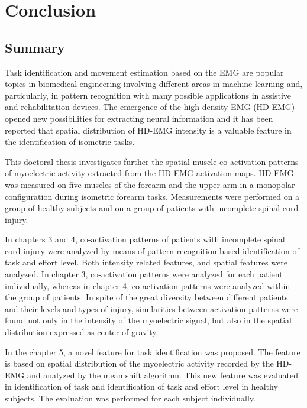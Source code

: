 \chapter{Conclusion}
\label{ch:conclusions}

\section{Summary}

Task identification and movement estimation based on the EMG are popular topics in biomedical engineering involving different areas in machine learning and, particularly, in pattern recognition with many possible applications in assistive and rehabilitation devices. The emergence of the high-density EMG (HD-EMG) opened new possibilities for extracting neural information and it has been reported that spatial distribution of HD-EMG intensity is a valuable feature in the identification of isometric tasks.

This doctoral thesis investigates further the spatial muscle co-activation patterns of myoelectric activity extracted from the HD-EMG activation maps. HD-EMG was measured on five muscles of the forearm and the upper-arm in a monopolar configuration during isometric forearm tasks. Measurements were performed on a group of healthy subjects and on a group of patients with incomplete spinal cord injury.

In chapters 3 and 4, co-activation patterns of patients with incomplete spinal cord injury were analyzed by means of pattern-recognition-based identification of task and effort level. Both intensity related features, and spatial features were analyzed. In chapter 3, co-activation patterns were analyzed for each patient individually, whereas in chapter 4, co-activation patterns were analyzed within the group of patients. In spite of the great diversity between different patients and their levels and types of injury, similarities between activation patterns were found not only in the intensity of the myoelectric signal, but also in the spatial distribution expressed as center of gravity.

In the chapter 5, a novel feature for task identification was proposed. The feature is based on spatial distribution of the myoelectric activity recorded by the HD-EMG and analyzed by the mean shift algorithm. This new feature was evaluated in identification of task and identification of task and effort level in healthy subjects. The evaluation was performed for each subject individually. 


